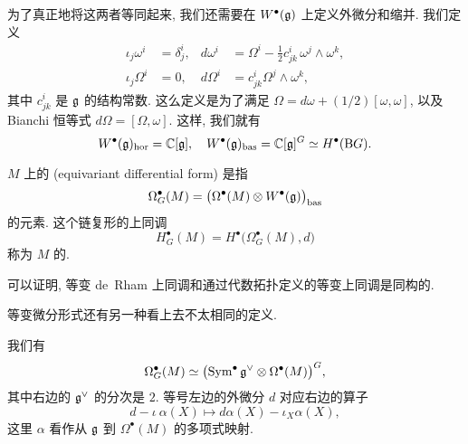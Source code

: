 为了真正地将这两者等同起来, 我们还需要在
$W^\bullet (\mathfrak{g})$ 上定义外微分和缩并.
我们定义
\begin{align*}
    \iota_j \omega^i &= \delta_j^i, 
        & d \omega^i &= \Omega^i - \frac12 c^i_{jk} \, \omega^j \wedge \omega^k, \\
    \iota_j \Omega^i &= 0, 
        & d \Omega^i &= c^i_{jk} \Omega^j \wedge \omega^k,
\end{align*}
其中 $c^i_{jk}$ 是 $\mathfrak{g}$ 的结构常数.
这么定义是为了满足 $\Omega = d \omega + (1/2) [\omega, \omega]$,
以及 Bianchi 恒等式 $d \Omega = [\Omega, \omega]$. 
这样, 我们就有
\[ W^\bullet (\mathfrak{g})_{\mathrm{hor}} = \mathbb{C} [\mathfrak{g}], \quad
    W^\bullet (\mathfrak{g})_{\mathrm{bas}} = \mathbb{C} [\mathfrak{g}]^G
    \simeq H^\bullet (\mathrm{B} G) . \]

\begin{definition}
    $M$ 上的 (equivariant differential form) 是指
    \[ \Omega_G^\bullet (M) = \bigl(
        \Omega^\bullet (M) \otimes W^\bullet (\mathfrak{g})
        \bigr)_{\mathrm{bas}} \]
    的元素. 这个链复形的上同调
    \[ H_G^\bullet (M) = H^\bullet \bigl( \Omega_G^\bullet (M), d \bigr) \]
    称为 $M$ 的.
\end{definition}

可以证明, 等变 de~Rham 上同调和通过代数拓扑定义的等变上同调是同构的.

等变微分形式还有另一种看上去不太相同的定义.

\begin{proposition}
    我们有
    \[ \Omega_G^\bullet (M) \simeq
        \bigl( \operatorname{Sym}^\bullet \mathfrak{g}^\vee \otimes 
        \Omega^\bullet (M) \bigr)^G , \]
    其中右边的 $\mathfrak{g}^\vee$ 的分次是 $2$.
    等号左边的外微分 $d$ 对应右边的算子
    \[ d - \iota \: \alpha (X) \mapsto d \alpha (X) - \iota_X \alpha (X), \]
    这里 $\alpha$ 看作从 $\mathfrak{g}$ 到 $\Omega^\bullet (M)$
    的多项式映射.
\end{proposition}

